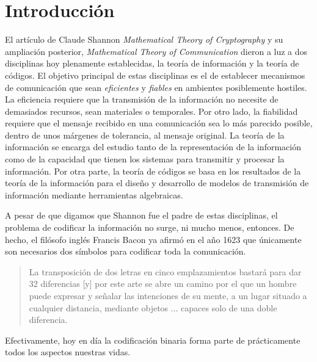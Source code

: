 \chapter*{Introducción}
 
El artículo de Claude Shannon \textit{Mathematical Theory of Cryptography} \parencite{shannon_mathematical_1945} y su ampliación posterior, \textit{Mathematical Theory of Communication} \parencite{shannon_mathematical_1948} dieron a luz a dos disciplinas hoy plenamente establecidas, la teoría de información y la teoría de códigos.
El objetivo principal de estas disciplinas es el de establecer mecanismos de comunicación que sean \emph{eficientes} y \emph{fiables} en ambientes posiblemente hostiles.
La eficiencia requiere que la transmisión de la información no necesite de demasiados recursos, sean materiales o temporales.
Por otro lado, la fiabilidad requiere que el mensaje recibido en una comunicación sea lo más parecido posible, dentro de unos márgenes de tolerancia, al mensaje original.
La teoría de la información se encarga del estudio tanto de la representación de la información como de la capacidad que tienen los sistemas para transmitir y procesar la información. 
Por otra parte, la teoría de códigos se basa en los resultados de la teoría de la información para el diseño y desarrollo de modelos de transmisión de información mediante herramientas algebraicas.

A pesar de que digamos que Shannon fue el padre de estas disciplinas, el problema de codificar la información no surge, ni mucho menos, entonces.
De hecho, el filósofo inglés Francis Bacon ya afirmó en el año 1623 que únicamente son necesarios dos símbolos para codificar toda la comunicación.
\blockquote[{\cite[30]{dyson_catedral_2015}}]{La transposición de dos letras en cinco emplazamientos bastará para dar 32 diferencias [y] por este arte se abre un camino por el que un hombre puede expresar y señalar las intenciones de su mente, a un lugar situado a cualquier distancia, mediante objetos ... capaces solo de una doble diferencia.}
Efectivamente, hoy en día la codificación binaria forma parte de prácticamente todos los aspectos nuestras vidas.

